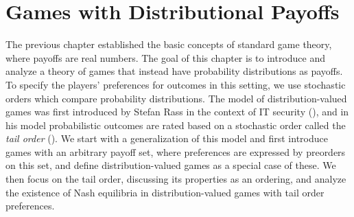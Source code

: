 \documentclass[a4paper]{scrreprt}
\theoremstyle{definition}
\begin{document}
    \chapter{Games with Distributional Payoffs}
    \label{chap:gamesWithDistributionalPayoffs}
    The previous chapter established the basic concepts of standard game theory, where payoffs are real numbers.
    The goal of this chapter is to introduce and analyze a theory of games that instead have probability distributions as payoffs.
    To specify the players' preferences for outcomes in this setting, we use stochastic orders which compare probability distributions.
    The model of distribution-valued games was first introduced by Stefan Rass
    in the context of IT security (\cite{bib:rassGameRiskManagI,bib:rassGameRiskManagII,bib:rassGameRiskManagIII}), and in his model probabilistic outcomes are rated based on a stochastic order called the \emph{tail order} (\cite{bib:rassTotalOrderingOnLossDistributions}).
    We start with a generalization of this model and first introduce games with an arbitrary payoff set, where preferences are expressed by preorders on this set, and define distribution-valued games as a special case of these.
    We then focus on the tail order, discussing its properties as an ordering, and analyze the existence of Nash equilibria in distribution-valued games with tail order preferences.
    
\end{document}
